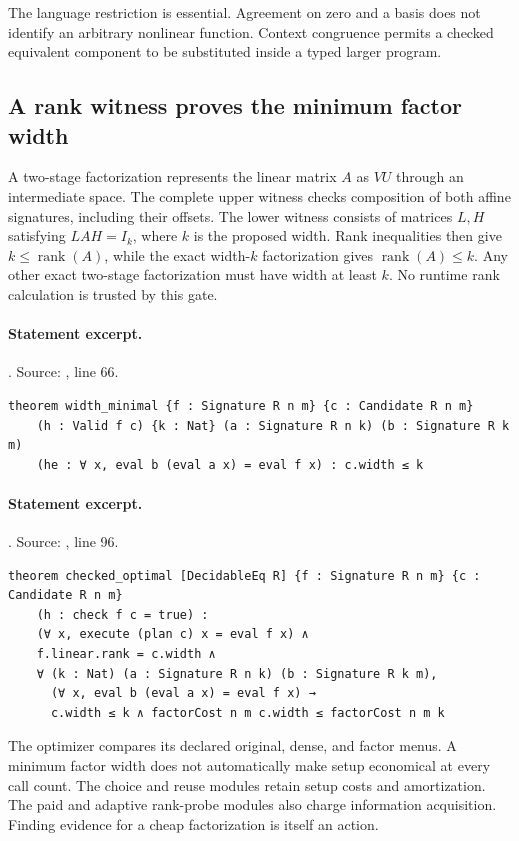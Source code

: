 \documentclass[11pt]{article}
\begin{document}
The language restriction is essential. Agreement on zero and a basis does not
identify an arbitrary nonlinear function. Context congruence permits a checked
equivalent component to be substituted inside a typed larger program.

\subsection{A rank witness proves the minimum factor width}
A two-stage factorization represents the linear matrix $A$ as $VU$ through an
intermediate space. The complete upper witness checks composition of both
affine signatures, including their offsets. The lower witness consists of
matrices $L,H$ satisfying $LAH=I_k$, where $k$ is the proposed width. Rank
inequalities then give $k\le\operatorname{rank}(A)$, while the exact width-$k$
factorization gives $\operatorname{rank}(A)\le k$. Any other exact two-stage
factorization must have width at least $k$. No runtime rank calculation is
trusted by this gate.

\paragraph{Statement excerpt.}. Source: , line 66.
\begin{lstlisting}[style=AVOCSource]
theorem width_minimal {f : Signature R n m} {c : Candidate R n m}
    (h : Valid f c) {k : Nat} (a : Signature R n k) (b : Signature R k m)
    (he : ∀ x, eval b (eval a x) = eval f x) : c.width ≤ k
\end{lstlisting}

\paragraph{Statement excerpt.}. Source: , line 96.
\begin{lstlisting}[style=AVOCSource]
theorem checked_optimal [DecidableEq R] {f : Signature R n m} {c : Candidate R n m}
    (h : check f c = true) :
    (∀ x, execute (plan c) x = eval f x) ∧
    f.linear.rank = c.width ∧
    ∀ (k : Nat) (a : Signature R n k) (b : Signature R k m),
      (∀ x, eval b (eval a x) = eval f x) →
      c.width ≤ k ∧ factorCost n m c.width ≤ factorCost n m k
\end{lstlisting}


The optimizer compares its declared original, dense, and factor menus. A
minimum factor width does not automatically make setup economical at every
call count. The choice and reuse modules retain setup costs and amortization.
The paid and adaptive rank-probe modules also charge information acquisition.
Finding evidence for a cheap factorization is itself an action.
\end{document}
